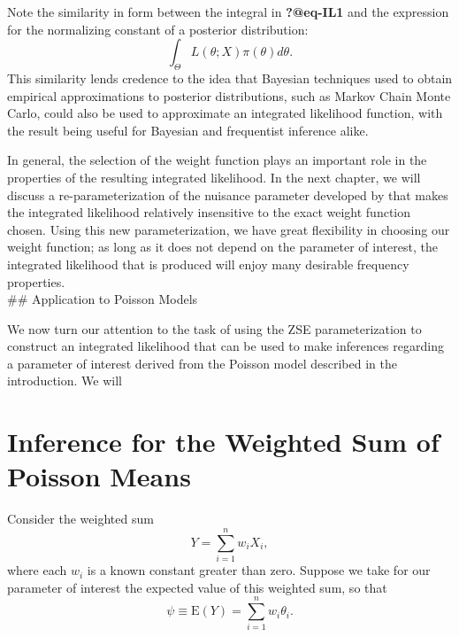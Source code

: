 \documentclass[
  12pt]{article}
\begin{document}
Note the similarity in form between the integral in \textbf{?@eq-IL1}
and the expression for the normalizing constant of a posterior
distribution: \[\int_{\Theta} L(\theta; X)\pi(\theta) d\theta.\] This
similarity lends credence to the idea that Bayesian techniques used to
obtain empirical approximations to posterior distributions, such as
Markov Chain Monte Carlo, could also be used to approximate an
integrated likelihood function, with the result being useful for
Bayesian and frequentist inference alike.

In general, the selection of the weight function plays an important role
in the properties of the resulting integrated likelihood. In the next
chapter, we will discuss a re-parameterization of the nuisance parameter
developed by \citet{severini2007} that makes the integrated likelihood
relatively insensitive to the exact weight function chosen. Using this
new parameterization, we have great flexibility in choosing our weight
function; as long as it does not depend on the parameter of interest,
the integrated likelihood that is produced will enjoy many desirable
frequency properties.\\
\#\# Application to Poisson Models

We now turn our attention to the task of using the ZSE parameterization
to construct an integrated likelihood that can be used to make
inferences regarding a parameter of interest derived from the Poisson
model described in the introduction. We will

\section{Inference for the Weighted Sum of Poisson
Means}\label{inference-for-the-weighted-sum-of-poisson-means}

Consider the weighted sum \[Y = \sum_{i=1}^n w_iX_i,\] where each
\(w_i\) is a known constant greater than zero. Suppose we take for our
parameter of interest the expected value of this weighted sum, so that
\[\psi \equiv \text{E}(Y) = \sum_{i=1}^n w_i\theta_i.\]


\renewcommand\refname{Examples}
  
\end{document}
